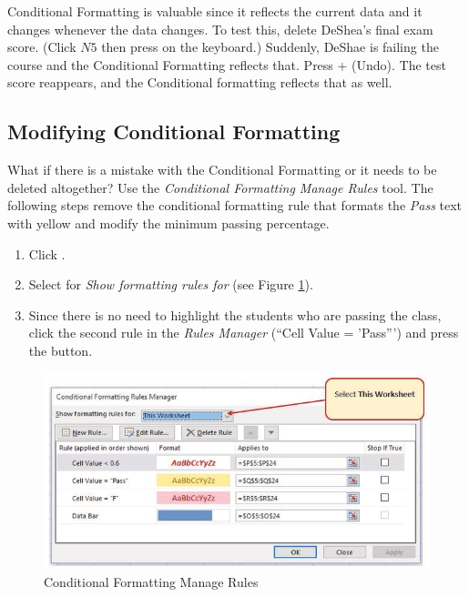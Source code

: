 Conditional Formatting is valuable since it reflects the current data and it changes whenever the data changes. To test this, delete DeShea's final exam score. (Click $ N5 $ then press  on the keyboard.) Suddenly, DeShae is failing the course and the Conditional Formatting reflects that. Press  +  (Undo). The test score reappears, and the Conditional formatting reflects that as well.

\subsection{Modifying Conditional Formatting}

What if there is a mistake with the Conditional Formatting or it needs to be deleted altogether? Use the \textit{Conditional Formatting Manage Rules} tool. The following steps remove the conditional formatting rule that formats the \textit{Pass} text with yellow and modify the minimum passing percentage.

\begin{enumerate}
	\item Click . 
	\item Select  for \textit{Show formatting rules for} (see Figure \ref{03:fig23}).
	\item Since there is no need to highlight the students who are passing the class, click the second rule in the \textit{Rules Manager} (``Cell Value = 'Pass''') and press the  button.
\end{enumerate}

\begin{figure}[H]
	\centering
	\includegraphics[width=\maxwidth{.95\linewidth}]{gfx/ch03_fig23}
	\caption{Conditional Formatting Manage Rules}
	\label{03:fig23}
\end{figure}

